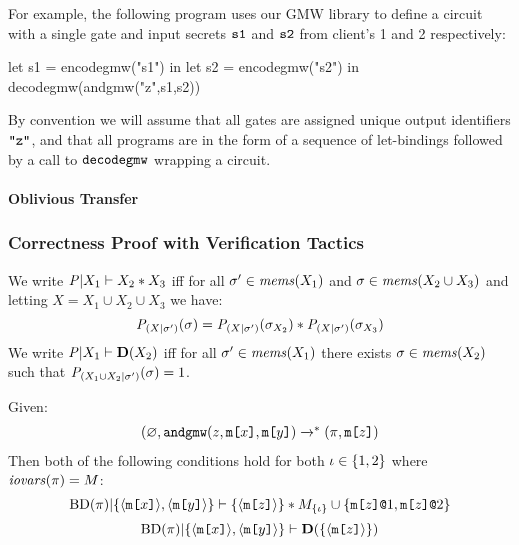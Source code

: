 For example, the following program uses our GMW library to define
a circuit with a single \eand gate and input secrets $\texttt{s1}$ and
$\texttt{s2}$ from client's 1 and 2 respectively:
\begin{verbatimtab}
         let s1 = encodegmw("s1") in
         let s2 = encodegmw("s2") in
         decodegmw(andgmw("z",s1,s2))
\end{verbatimtab}
By convention we will assume that all gates are assigned unique output
identifiers $\texttt{"z"}$, and that all programs are in the form
of a sequence of let-bindings followed by a call to $\texttt{decodegmw}$
wrapping a circuit.

\paragraph{Oblivious Transfer} 

\subsubsection{Correctness Proof with Verification Tactics}

\begin{definition}
  We write $\mathit{P}|X_1 \vdash X_2 * X_3$ iff for all
  $\sigma' \in \mathit{mems}(X_1)$ and $\sigma \in \mathit{mems}(X_2 \cup X_3)$
  and letting $X = X_1 \cup X_2 \cup X_3$ we have:
  $$\mathit{P}_{({X}|{\sigma'})}(\sigma) =
  \mathit{P}_{({X}|{\sigma'})}(\sigma_{X_2}) *
  \mathit{P}_{({X}|{\sigma'})}(\sigma_{X_3})$$
  We write $\mathit{P}|X_1 \vdash \mathbf{D}(X_2)$ iff for all
  $\sigma' \in \mathit{mems}(X_1)$ there exists 
  $\sigma \in \mathit{mems}(X_2)$ such that
  $\mathit{P}_{({X_1 \cup X_2}|{\sigma'})}(\sigma) = 1$.
\end{definition}

\begin{lemma}
  Given:
  $$
  \begin{array}{c}
  (\varnothing,\andgmw(z,\mesg{x},\mesg{y}) \redxs %
  (\prog,\mesg{z})
  \end{array}
  $$
  Then both of the following conditions hold for both $\iota \in \{ 1,2 \}$ where $\mathit{iovars}(\pi) = M$:
  $$
  \mathrm{BD}(\pi)|\{ \langle \texttt{m[}x\texttt{]} \rangle,\langle \texttt{m[}y\texttt{]} \rangle \} \vdash \{ \langle \texttt{m[}z\texttt{]} \rangle \} * M_{\{\iota\}} \cup \{ \texttt{m[}z\texttt{]}\texttt{@}1,\texttt{m[}z\texttt{]}\texttt{@}2 \}
  $$
  $$
  \mathrm{BD}(\pi)|\{ \langle \texttt{m[}x\texttt{]} \rangle,\langle \texttt{m[}y\texttt{]} \rangle \} \vdash \mathbf{D}(\{ \langle \texttt{m[}z\texttt{]} \rangle \})    
  $$
\end{lemma}


